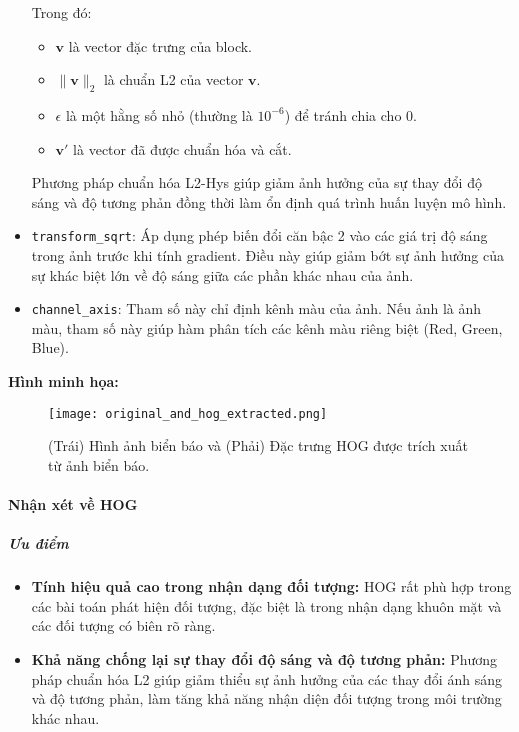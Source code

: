\documentclass[a4paper,12pt]{article}
\begin{document}
\begin{itemize}
    Trong đó:
    \begin{itemize}
        \item \(\mathbf{v}\) là vector đặc trưng của block.
        \item \(\|\mathbf{v}\|_2\) là chuẩn L2 của vector \(\mathbf{v}\).
        \item \(\epsilon\) là một hằng số nhỏ (thường là \(10^{-6}\)) để tránh chia cho 0.
        \item \(\mathbf{v'}\) là vector đã được chuẩn hóa và cắt.
    \end{itemize}
    Phương pháp chuẩn hóa L2-Hys giúp giảm ảnh hưởng của sự thay đổi độ sáng và độ tương phản đồng thời làm ổn định quá trình huấn luyện mô hình.
    
    \item \texttt{transform\_sqrt}: Áp dụng phép biến đổi căn bậc 2 vào các giá trị độ sáng trong ảnh trước khi tính gradient. Điều này giúp giảm bớt sự ảnh hưởng của sự khác biệt lớn về độ sáng giữa các phần khác nhau của ảnh.
    \item \texttt{channel\_axis}: Tham số này chỉ định kênh màu của ảnh. Nếu ảnh là ảnh màu, tham số này giúp hàm phân tích các kênh màu riêng biệt (Red, Green, Blue).
\end{itemize}

\noindent
\textbf{Hình minh họa:}
\begin{figure}[H]
    \centering
    \texttt{[image: original\_and\_hog\_extracted.png]}
    \caption{\centering (Trái) Hình ảnh biển báo và (Phải) Đặc trưng HOG được trích xuất từ ảnh biển báo.}
    \label{fig:hog}
\end{figure}

\paragraph{Nhận xét về HOG}

\subparagraph{Ưu điểm}
\begin{itemize}
    \item \textbf{Tính hiệu quả cao trong nhận dạng đối tượng:} HOG rất phù hợp trong các bài toán phát hiện đối tượng, đặc biệt là trong nhận dạng khuôn mặt và các đối tượng có biên rõ ràng.
    \item \textbf{Khả năng chống lại sự thay đổi độ sáng và độ tương phản:} Phương pháp chuẩn hóa L2 giúp giảm thiểu sự ảnh hưởng của các thay đổi ánh sáng và độ tương phản, làm tăng khả năng nhận diện đối tượng trong môi trường khác nhau.
\end{itemize}
\end{document}
